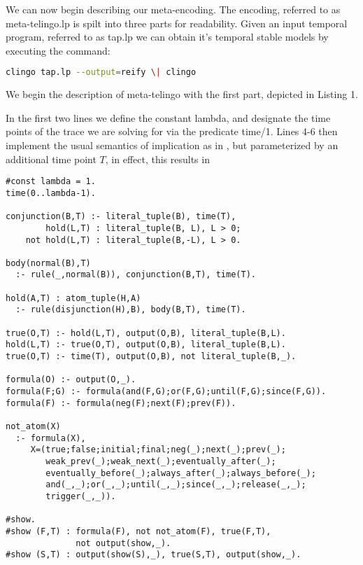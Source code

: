 We can now begin describing our meta-encoding. The encoding, referred
to as meta-telingo.lp is spilt into three parts for readability. Given
an input temporal program, referred to as tap.lp we can obtain it's temporal stable
models by executing the command:

\begin{lstlisting}[language=bash,numbers=none]
clingo tap.lp --output=reify \| clingo
\end{lstlisting}

 We begin the description of meta-telingo with the first part,
 depicted in Listing 1.

 In the first two lines we define the constant lambda, and designate
 the time points of the trace we are solving for via the predicate
 time/1. Lines 4-6 then implement the usual semantics of implication
 as in \cite{karoscwa21a}, but parameterized by an additional time
 point $T$, in effect, this results in

\begin{center}
\begin{minipage}{\linewidth}
\begin{lstlisting}[language=clingo, label={meta-telingo-one}]
#const lambda = 1.
time(0..lambda-1).

conjunction(B,T) :- literal_tuple(B), time(T),
        hold(L,T) : literal_tuple(B, L), L > 0;
    not hold(L,T) : literal_tuple(B,-L), L > 0.

body(normal(B),T) 
  :- rule(_,normal(B)), conjunction(B,T), time(T).

hold(A,T) : atom_tuple(H,A)   
  :- rule(disjunction(H),B), body(B,T), time(T).

true(O,T) :- hold(L,T), output(O,B), literal_tuple(B,L).
hold(L,T) :- true(O,T), output(O,B), literal_tuple(B,L).
true(O,T) :- time(T), output(O,B), not literal_tuple(B,_).

formula(O) :- output(O,_).
formula(F;G) :- formula(and(F,G);or(F,G);until(F,G);since(F,G)).
formula(F) :- formula(neg(F);next(F);prev(F)).

not_atom(X)
  :- formula(X), 
     X=(true;false;initial;final;neg(_);next(_);prev(_);
        weak_prev(_);weak_next(_);eventually_after(_);
        eventually_before(_);always_after(_);always_before(_);
        and(_,_);or(_,_);until(_,_);since(_,_);release(_,_);
        trigger(_,_)).

#show.
#show (F,T) : formula(F), not not_atom(F), true(F,T), 
              not output(show,_).
#show (S,T) : output(show(S),_), true(S,T), output(show,_).
\end{lstlisting}
\end{minipage}
\end{center}

